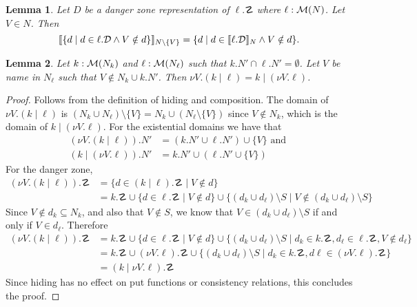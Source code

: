 \documentclass{article}
\newtheorem{lemma}{Lemma}
\begin{document}
\begin{lemma}
    Let $D$ be a danger zone representation of $\ell.\danger$ where
    $\ell : \mathcal M(N)$. Let $V \in N$. Then 
    \[ \llbracket \{d \mid d \in \ell.\mathcal D \land V \notin d\} \rrbracket_{N\setminus\{V\}}
        = \{ d \mid d \in \llbracket \ell.\mathcal D \rrbracket_{N} \land V \notin d\}. \]
\end{lemma}

\begin{lemma}
    Let $k : \mathcal M(N_k)$ and $\ell : \mathcal M(N_\ell)$ such that $k.N' \cap \ell.N' = \emptyset$.
    Let $V$ be name in $N_\ell$ such that $V \notin N_k \cup k.N'$.
    Then $\nu V.(k \mid \ell) = k \mid (\nu V.\ell)$.
\end{lemma}
\begin{proof}
    Follows from the definition of hiding and composition.
    The domain of $\nu V.(k \mid \ell)$ is 
    $(N_k \cup N_\ell) \setminus \{V\} = N_k \cup (N_\ell \setminus \{V\})$ 
    since $V \notin N_k$, which is the domain of $k \mid (\nu V.\ell)$. 
    For the existential domains we have that
    \begin{align*}
        (\nu V.(k \mid \ell)).N' &= (k.N' \cup \ell.N') \cup \{V\} \text{ and }\\
        (k \mid (\nu V.\ell)).N' &= k.N' \cup (\ell.N' \cup \{V\})
    \end{align*}
    For the danger zone,
    \begin{align*}
        (\nu V.(k \mid \ell)).\danger &= \{d \in (k \mid \ell).\danger \mid V \notin d \} \\
        &= k.\danger \cup \{d \in \ell.\danger \mid V \notin d \} 
        \cup \{(d_k \cup d_\ell) \setminus S \mid V \notin (d_k \cup d_\ell)\setminus S \}
    \end{align*}
    Since $V \notin d_k \subseteq N_k$, and also that $V \notin S$, we know that
    $V \in (d_k \cup d_\ell) \setminus S$ if and only if $V \in d_\ell$. Therefore
    \begin{align*}
        (\nu V.(k \mid \ell)).\danger &= k.\danger \cup \{d \in \ell.\danger \mid V \notin d \}
        \cup \{(d_k \cup d_\ell) \setminus S \mid d_k \in k.\danger, d_\ell \in \ell.\danger, V \notin d_\ell \} \\
        &= k.\danger \cup (\nu V.\ell).\danger \cup \{(d_k \cup d_\ell) \setminus S \mid
            d_k \in k.\danger, d\ell \in (\nu V.\ell).\danger \} \\
        &= (k \mid \nu V.\ell).\danger
    \end{align*}
    Since hiding has no effect on put functions or consistency relations, 
    this concludes the proof.
\end{proof}
\end{document}
